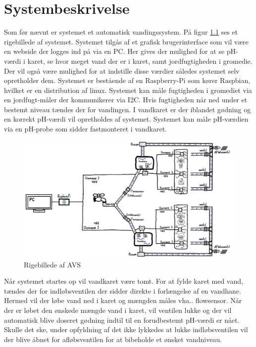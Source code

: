 \chapter{Systembeskrivelse}
Som før nævnt er systemet et automatisk vandingssystem. På figur \ref{photo:RigeBillede} ses et rigebillede af systemet. Systemet tilgås af et grafisk brugerinterface som vil være en webside der logges ind på via en PC. Her gives der mulighed for at se pH-værdi i karet, se hvor meget vand der er i karet, samt jordfugtigheden i gromedie. Der vil også være mulighed for at indstille disse værdier således systemet selv opretholder dem. Systemet er bestående af en  Raspberry-Pi som kører Raspbian, hvilket er en distribution af linux. Systemet kan måle fugtigheden i gromediet via en jordfugt-måler der kommunikerer via I2C.\newline 
Hvis fugtigheden når ned under et bestemt niveau tændes der for vandingen. I vandkaret er der iblandet gødning og en korrekt pH-værdi vil opretholdes af systemet. Systemet kan måle pH-værdien via en pH-probe som sidder fastmonteret i vandkaret.
 
\begin{figure}[H]
	\centering
	\includegraphics[scale=0.45]{Systembeskrivelse/rigebillede}
	\caption{Rigebillede af AVS}
	\label{photo:RigeBillede}
\end{figure}

Når systemet startes op vil vandkaret være tomt. For at fylde karet med vand, tændes der for indløbsventilen der sidder direkte i forlængelse af en vandhane. Hermed vil der løbe vand ned i karet og mængden måles vha.. flowsensor. Når der er løbet den ønskede mængde vand i karet, vil ventilen lukke og der vil automatisk blive doseret gødning indtil til en forudbestemt pH-værdi er nået. Skulle det ske, under opfyldning af det ikke lykkedes at lukke indløbsventilen vil der blive åbnet for afløbsventilen for at bibeholde et ønsket vandniveau.


